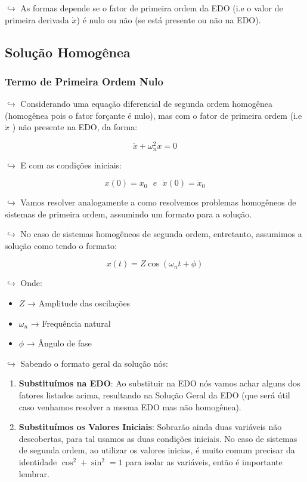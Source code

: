 \documentclass[]{article}
\providecommand{\tightlist}{%
  \setlength{\itemsep}{0pt}\setlength{\parskip}{0pt}}
\begin{document}
  \(\hookrightarrow\) As formas depende se o fator de primeira ordem da
  EDO (i.e o valor de primeira derivada \(\dot x\)) é nulo ou não (se está
  presente ou não na EDO).

  \hypertarget{soluuxe7uxe3o-homoguxeanea-1}{%
  \subsection{Solução Homogênea}\label{soluuxe7uxe3o-homoguxeanea-1}}

  \hypertarget{termo-de-primeira-ordem-nulo}{%
  \subsubsection{Termo de Primeira Ordem
  Nulo}\label{termo-de-primeira-ordem-nulo}}

  \(\hookrightarrow\) Considerando uma equação diferencial de segunda
  ordem homogênea (homogênea pois o fator forçante é nulo), mas com o
  fator de primeira ordem (i.e \(\dot x\) ) não presente na EDO, da forma:

  \[
  \ddot x + \omega^2_nx = 0
  \]

  \(\hookrightarrow\) E com as condições iniciais:

  \[
  x(0) = x_0 \ \ \ e \ \ \ \dot x(0) = \dot x_0
  \]

  \(\hookrightarrow\) Vamos resolver analogamente a como resolvemos
  problemas homogêneos de sistemas de primeira ordem, assumindo um formato
  para a solução.

  \(\hookrightarrow\) No caso de sistemas homogêneos de segunda ordem,
  entretanto, assumimos a solução como tendo o formato:

  \[
  x(t) = Z \cos(\omega_n t + \phi)
  \]

  \(\hookrightarrow\) Onde:

  \begin{itemize}
  \tightlist
  \item
    \(Z\) → Amplitude das oscilações
  \item
    \(\omega_n\) → Frequência natural
  \item
    \(\phi\) → Ângulo de fase
  \end{itemize}

  \(\hookrightarrow\) Sabendo o formato geral da solução nós:

  \begin{enumerate}
  \def\labelenumi{\arabic{enumi}.}
  \tightlist
  \item
    \textbf{Substituímos na EDO}: Ao substituir na EDO nós vamos achar
    alguns dos fatores listados acima, resultando na Solução Geral da EDO
    (que será útil caso venhamos resolver a mesma EDO mas não homogênea).
  \item
    \textbf{Substituímos os Valores Iniciais}: Sobrarão ainda duas
    variáveis não descobertas, para tal usamos as duas condições iniciais.
    No caso de sistemas de segunda ordem, ao utilizar os valores inicias,
    é muito comum precisar da identidade \(\cos ^2 + \sin^2 = 1\) para
    isolar as variáveis, então é importante lembrar.
  \end{enumerate}
\end{document}
